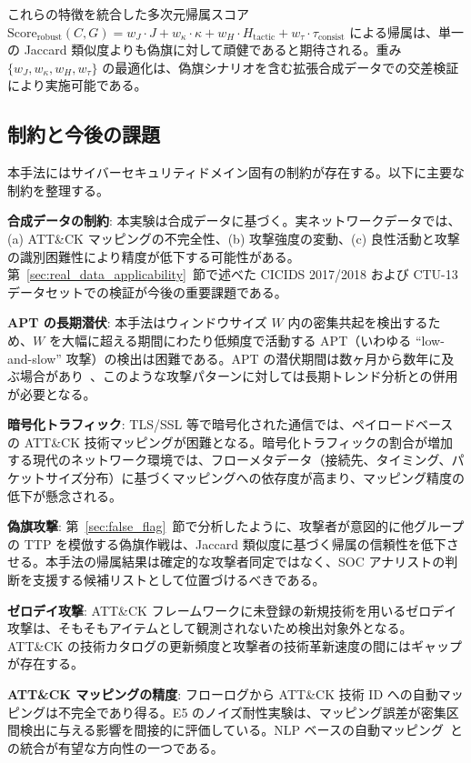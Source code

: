 \documentclass[11pt]{article}
\begin{document}
これらの特徴を統合した多次元帰属スコア $\text{Score}_{\text{robust}}(C, G) = w_J \cdot J + w_\kappa \cdot \kappa + w_H \cdot H_{\text{tactic}} + w_\tau \cdot \tau_{\text{consist}}$ による帰属は、単一の Jaccard 類似度よりも偽旗に対して頑健であると期待される。重み $\{w_J, w_\kappa, w_H, w_\tau\}$ の最適化は、偽旗シナリオを含む拡張合成データでの交差検証により実施可能である。

\subsection{制約と今後の課題}

本手法にはサイバーセキュリティドメイン固有の制約が存在する。以下に主要な制約を整理する。

\textbf{合成データの制約}: 本実験は合成データに基づく。実ネットワークデータでは、(a) ATT\&CK マッピングの不完全性、(b) 攻撃強度の変動、(c) 良性活動と攻撃の識別困難性により精度が低下する可能性がある。第~\ref{sec:real_data_applicability}~節で述べた CICIDS 2017/2018 および CTU-13 データセットでの検証が今後の重要課題である。

\textbf{APT の長期潜伏}: 本手法はウィンドウサイズ $W$ 内の密集共起を検出するため、$W$ を大幅に超える期間にわたり低頻度で活動する APT（いわゆる ``low-and-slow'' 攻撃）の検出は困難である。APT の潜伏期間は数ヶ月から数年に及ぶ場合があり~\cite{hutchins2011intelligence}、このような攻撃パターンに対しては長期トレンド分析との併用が必要となる。

\textbf{暗号化トラフィック}: TLS/SSL 等で暗号化された通信では、ペイロードベースの ATT\&CK 技術マッピングが困難となる。暗号化トラフィックの割合が増加する現代のネットワーク環境では、フローメタデータ（接続先、タイミング、パケットサイズ分布）に基づくマッピングへの依存度が高まり、マッピング精度の低下が懸念される。

\textbf{偽旗攻撃}: 第~\ref{sec:false_flag}~節で分析したように、攻撃者が意図的に他グループの TTP を模倣する偽旗作戦は、Jaccard 類似度に基づく帰属の信頼性を低下させる。本手法の帰属結果は確定的な攻撃者同定ではなく、SOC アナリストの判断を支援する候補リストとして位置づけるべきである。

\textbf{ゼロデイ攻撃}: ATT\&CK フレームワークに未登録の新規技術を用いるゼロデイ攻撃は、そもそもアイテムとして観測されないため検出対象外となる。ATT\&CK の技術カタログの更新頻度と攻撃者の技術革新速度の間にはギャップが存在する。

\textbf{ATT\&CK マッピングの精度}: フローログから ATT\&CK 技術 ID への自動マッピングは不完全であり得る。E5 のノイズ耐性実験は、マッピング誤差が密集区間検出に与える影響を間接的に評価している。NLP ベースの自動マッピング~\cite{legoy2020automated}との統合が有望な方向性の一つである。
\end{document}

